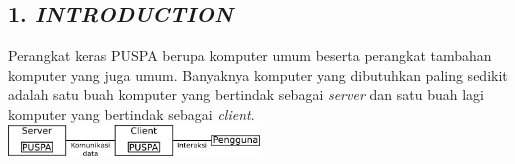 \subsection*{\textcolor{subsectioncolor}{\textsf{1. \textit{INTRODUCTION}}}}

Perangkat keras PUSPA berupa komputer umum beserta perangkat tambahan komputer yang juga umum.
Banyaknya komputer yang dibutuhkan paling sedikit adalah satu buah komputer yang bertindak sebagai \textit{server} dan satu buah lagi komputer yang bertindak sebagai \textit{client}.\\[0.3cm]
\includegraphics[width=0.5\textwidth]{Sistem}
